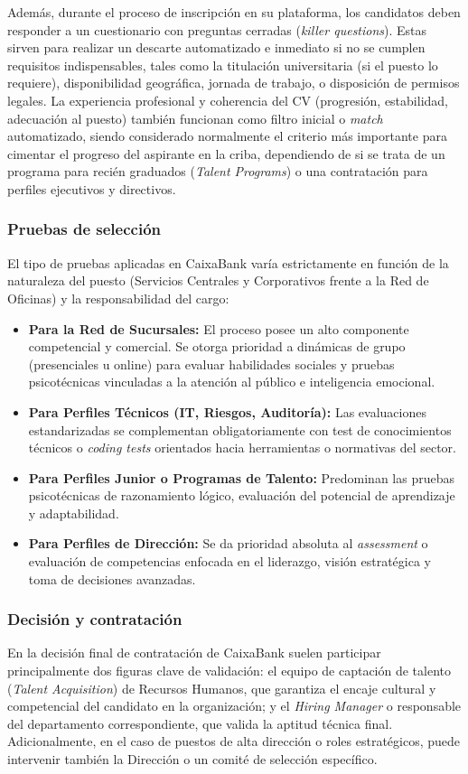 Además, durante el proceso de inscripción en su plataforma, los candidatos deben responder a un cuestionario con preguntas cerradas (\textit{killer questions}). Estas sirven para realizar un descarte automatizado e inmediato si no se cumplen requisitos indispensables, tales como la titulación universitaria (si el puesto lo requiere), disponibilidad geográfica, jornada de trabajo, o disposición de permisos legales. La experiencia profesional y coherencia del CV (progresión, estabilidad, adecuación al puesto) también funcionan como filtro inicial o \textit{match} automatizado, siendo considerado normalmente el criterio más importante para cimentar el progreso del aspirante en la criba, dependiendo de si se trata de un programa para recién graduados (\textit{Talent Programs}) o una contratación para perfiles ejecutivos y directivos.

\subsubsection{Pruebas de selección}
El tipo de pruebas aplicadas en CaixaBank varía estrictamente en función de la naturaleza del puesto (Servicios Centrales y Corporativos frente a la Red de Oficinas) y la responsabilidad del cargo:
\begin{itemize}
    \item \textbf{Para la Red de Sucursales:} El proceso posee un alto componente competencial y comercial. Se otorga prioridad a dinámicas de grupo (presenciales u online) para evaluar habilidades sociales y pruebas psicotécnicas vinculadas a la atención al público e inteligencia emocional.
    \item \textbf{Para Perfiles Técnicos (IT, Riesgos, Auditoría):} Las evaluaciones estandarizadas se complementan obligatoriamente con test de conocimientos técnicos o \textit{coding tests} orientados hacia herramientas o normativas del sector.
    \item \textbf{Para Perfiles Junior o Programas de Talento:} Predominan las pruebas psicotécnicas de razonamiento lógico, evaluación del potencial de aprendizaje y adaptabilidad.
    \item \textbf{Para Perfiles de Dirección:} Se da prioridad absoluta al \textit{assessment} o evaluación de competencias enfocada en el liderazgo, visión estratégica y toma de decisiones avanzadas.
\end{itemize}

\subsubsection{Decisión y contratación}
En la decisión final de contratación de CaixaBank suelen participar principalmente dos figuras clave de validación: el equipo de captación de talento (\textit{Talent Acquisition}) de Recursos Humanos, que garantiza el encaje cultural y competencial del candidato en la organización; y el \textit{Hiring Manager} o responsable del departamento correspondiente, que valida la aptitud técnica final. Adicionalmente, en el caso de puestos de alta dirección o roles estratégicos, puede intervenir también la Dirección o un comité de selección específico.

